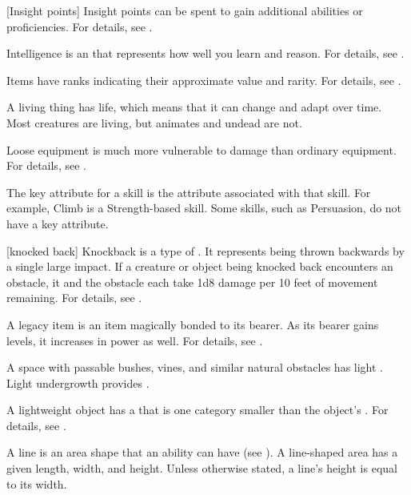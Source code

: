 [Insight points] Insight points can be spent to gain additional abilities or proficiencies.
For details, see .

 Intelligence is an  that represents how well you learn and reason.
For details, see .

 Items have ranks indicating their approximate value and rarity.
For details, see .

 A living thing has life, which means that it can change and adapt over time.
Most creatures are living, but animates and undead are not.

 Loose equipment is much more vulnerable to damage than ordinary equipment.
For details, see .

 The key attribute for a skill is the attribute associated with that skill.
For example, Climb is a Strength-based skill.
Some skills, such as Persuasion, do not have a key attribute.

[knocked back] Knockback is a type of .
It represents being thrown backwards by a single large impact.
If a creature or object being knocked back encounters an obstacle, it and the obstacle each take 1d8 damage per 10 feet of movement remaining.
For details, see .

 A legacy item is an item magically bonded to its bearer.
As its bearer gains levels, it increases in power as well.
For details, see .

 A space with passable bushes, vines, and similar natural obstacles has light .
Light undergrowth provides .

 A lightweight object has a  that is one category smaller than the object's .
For details, see .

 A line is an area shape that an ability can have (see ).
A line-shaped area has a given length, width, and height.
Unless otherwise stated, a line's height is equal to its width.

